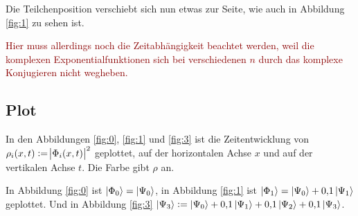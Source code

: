 Die Teilchenposition verschiebt sich nun etwas zur Seite, wie auch in Abbildung
\ref{fig:1} zu sehen ist.

\textcolor{darkred}{
	Hier muss allerdings noch die Zeitabhängigkeit beachtet werden, weil die
	komplexen Exponentialfunktionen sich bei verschiedenen $n$ durch das
	komplexe Konjugieren nicht wegheben.
}


\subsection{Plot}

In den Abbildungen \ref{fig:0}, \ref{fig:1} und \ref{fig:3} ist die
Zeitentwicklung von $\rho_i(x, t) := \abs{\Phi_i(x, t)}^2$ geplottet, auf der
horizontalen Achse $x$ und auf der vertikalen Achse $t$. Die Farbe gibt $\rho$
an.

In Abbildung \ref{fig:0} ist $\left| \Phi_0 \right\rangle = \left| \Psi_0 \right\rangle$, in Abbildung
\ref{fig:1} ist $\left| \Phi_1 \right\rangle = \left| \Psi_0 \right\rangle + \num{0.1} \left| \Psi_1 \right\rangle$
geplottet. Und in Abbildung \ref{fig:3} $\left| \Psi_3 \right\rangle := \left| \Psi_0 \right\rangle +
\num{0.1} \left| \Psi_1 \right\rangle + \num{0.1} \left| \Psi_2 \right\rangle + \num{0.1} \left| \Psi_3 \right\rangle$.

